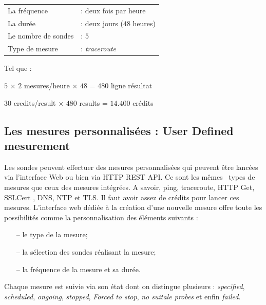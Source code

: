 \begin{table}[H]
	\begin{tabular}{ l l }
		La fréquence &: deux fois par heure \\ 
		La durée &: deux jours ($48$ heures) \\
		Le nombre de sondes&: $5$\\
		Type de mesure &: \textit{traceroute}\\
	\end{tabular}
\end{table}
Tel que :
\begin{tcolorbox}
	\begin{center}
		$5$ $\times$ $2$ mesures/heure $\times$ $48$ = $480$ ligne résultat
		
		$30$ credits/result $\times$ $480$ results = $14.400$ crédits
	\end{center}
\end{tcolorbox}	

\subsection{Les mesures personnalisées : User Defined mesurement} \label{par:udm}
Les sondes  peuvent effectuer des mesures personnalisées qui peuvent être lancées via l'interface Web \cite{create-UDM} ou bien via  HTTP REST API. %
Ce sont les m\^{e}mes~  types de mesures que ceux des mesures intégrées. A savoir, ping, traceroute,  HTTP Get, SSLCert , DNS, NTP et TLS. 
Il faut avoir assez de crédits pour lancer ces mesures. L'interface web dédiée à la création d'une nouvelle mesure offre toute les possibilités comme la personnalisation des éléments suivants :
\begin{itemize}
	\item[--] le type de la mesure;
	\item[--] la sélection des sondes réalisant la mesure;
	\item[--] la fréquence de la mesure et sa durée.
\end{itemize}
Chaque mesure est suivie via son état dont on distingue plusieurs  : \textit{specified}, \textit{scheduled}, \textit{ongoing}, \textit{stopped},  \textit{Forced to stop},  \textit{no suitale probes} et enfin  \textit{failed}.




